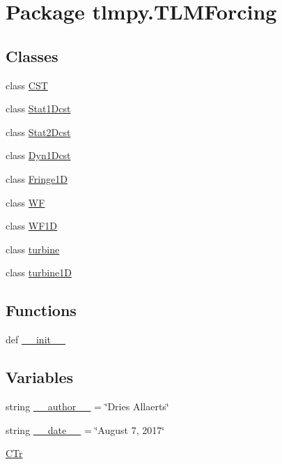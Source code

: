 \hypertarget{namespacetlmpy_1_1TLMForcing}{
\section{Package tlmpy.TLMForcing}
\label{namespacetlmpy_1_1TLMForcing}
}
\subsection*{Classes}
\begin{DoxyCompactItemize}
\item 
class \hyperlink{classtlmpy_1_1TLMForcing_1_1CST}{CST}
\item 
class \hyperlink{classtlmpy_1_1TLMForcing_1_1Stat1Dcst}{Stat1Dcst}
\item 
class \hyperlink{classtlmpy_1_1TLMForcing_1_1Stat2Dcst}{Stat2Dcst}
\item 
class \hyperlink{classtlmpy_1_1TLMForcing_1_1Dyn1Dcst}{Dyn1Dcst}
\item 
class \hyperlink{classtlmpy_1_1TLMForcing_1_1Fringe1D}{Fringe1D}
\item 
class \hyperlink{classtlmpy_1_1TLMForcing_1_1WF}{WF}
\item 
class \hyperlink{classtlmpy_1_1TLMForcing_1_1WF1D}{WF1D}
\item 
class \hyperlink{classtlmpy_1_1TLMForcing_1_1turbine}{turbine}
\item 
class \hyperlink{classtlmpy_1_1TLMForcing_1_1turbine1D}{turbine1D}
\end{DoxyCompactItemize}
\subsection*{Functions}
\begin{DoxyCompactItemize}
\item 
def \hyperlink{namespacetlmpy_1_1TLMForcing_ab507620d756cd88ed5301345e53c543c}{\_\-\_\-init\_\-\_\-}
\end{DoxyCompactItemize}
\subsection*{Variables}
\begin{DoxyCompactItemize}
\item 
string \hyperlink{namespacetlmpy_1_1TLMForcing_ad2789c7bfa2d6a6fd9f7543f4e46fb43}{\_\-\_\-author\_\-\_\-} = \char`\"{}Dries Allaerts\char`\"{}
\item 
string \hyperlink{namespacetlmpy_1_1TLMForcing_a4909953e978b5878903d59fa0b437e11}{\_\-\_\-date\_\-\_\-} = \char`\"{}August 7, 2017\char`\"{}
\item 
\hyperlink{namespacetlmpy_1_1TLMForcing_a39e57191ba184f7d89a22d291619d72d}{CTr}
\end{DoxyCompactItemize}


